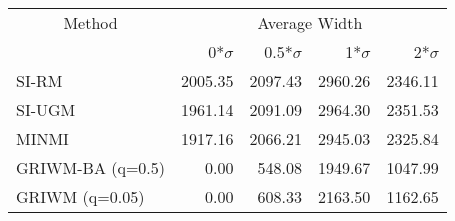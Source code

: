 
\begin{tabular}{lrrrr}
\toprule
\multicolumn{1}{c}{Method} & \multicolumn{4}{c}{Average Width} \\
 & 0*$\sigma$ & 0.5*$\sigma$ & 1*$\sigma$ & 2*$\sigma$\\
\midrule
SI-RM & 2005.35 & 2097.43 & 2960.26 & 2346.11\\
SI-UGM & 1961.14 & 2091.09 & 2964.30 & 2351.53\\
MINMI & 1917.16 & 2066.21 & 2945.03 & 2325.84\\
GRIWM-BA (q=0.5) & 0.00 & 548.08 & 1949.67 & 1047.99\\
GRIWM (q=0.05) & 0.00 & 608.33 & 2163.50 & 1162.65\\
\bottomrule
\end{tabular}
